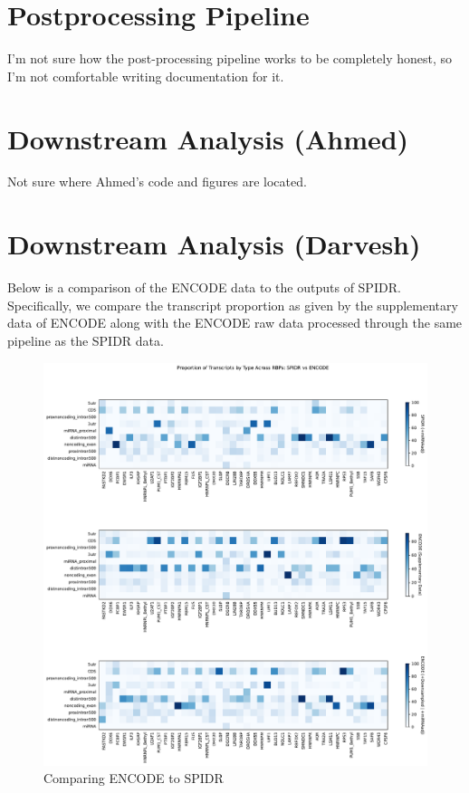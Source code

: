 \documentclass{article}
\begin{document}
    \section{Postprocessing Pipeline}
    I'm not sure how the post-processing pipeline works to be completely honest, so I'm not comfortable writing documentation for it.

    \section{Downstream Analysis (Ahmed)}
    Not sure where Ahmed's code and figures are located.

    \section{Downstream Analysis (Darvesh)}
    Below is a comparison of the ENCODE data to the outputs of SPIDR. Specifically, we compare the transcript proportion as given by the supplementary data of ENCODE along with the ENCODE raw data processed through the same pipeline as the SPIDR data.
    \begin{figure}[!ht]
        \centering
        \includegraphics[scale=0.4]{../figures/heatmap_spidr_vs_encode_miRNAadj.pdf}
        \caption[short]{Comparing ENCODE to SPIDR }
    \end{figure}
    
\end{document}
